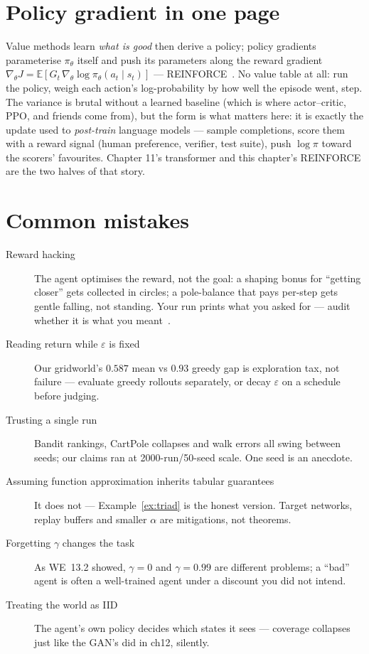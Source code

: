 \section{Policy gradient in one page}
\label{sec:pg}

Value methods learn \emph{what is good} then derive a policy; policy
gradients parameterise $\pi_\theta$ itself and push its parameters
along the reward gradient
$\nabla_\theta J = \mathbb E[G_t\,\nabla_\theta \log \pi_\theta(a_t
\mid s_t)]$ --- REINFORCE~\cite{williams1992}. No value table at all:
run the policy, weigh each action's log-probability by how well the
episode went, step. The variance is brutal without a learned baseline
(which is where actor--critic, PPO, and friends come from), but the
form is what matters here: it is exactly the update used to
\emph{post-train} language models --- sample completions, score them
with a reward signal (human preference, verifier, test suite), push
$\log \pi$ toward the scorers' favourites. Chapter 11's transformer
and this chapter's REINFORCE are the two halves of that story.

\section{Common mistakes}
\label{sec:rlmistakes}

\begin{description}
\item[Reward hacking] The agent optimises the reward, not the goal:
a shaping bonus for ``getting closer'' gets collected in circles; a
pole-balance that pays per-step gets gentle falling, not standing.
Your run prints what you asked for --- audit whether it is what you
meant~\cite{gymnasium_cartpole}.
\item[Reading return while $\varepsilon$ is fixed] Our gridworld's
$0.587$ mean vs $0.93$ greedy gap is exploration tax, not failure ---
evaluate greedy rollouts separately, or decay $\varepsilon$ on a
schedule before judging.
\item[Trusting a single run] Bandit rankings, CartPole collapses and
walk errors all swing between seeds; our claims ran at
2000-run/50-seed scale. One seed is an anecdote.
\item[Assuming function approximation inherits tabular guarantees]
It does not --- Example~\ref{ex:triad} is the honest version. Target
networks, replay buffers and smaller $\alpha$ are mitigations, not
theorems.
\item[Forgetting $\gamma$ changes the task] As WE~13.2 showed,
$\gamma{=}0$ and $\gamma{=}0.99$ are different problems; a ``bad''
agent is often a well-trained agent under a discount you did not
intend.
\item[Treating the world as IID] The agent's own policy decides which
states it sees --- coverage collapses just like the GAN's did in
ch12, silently.
\end{description}


